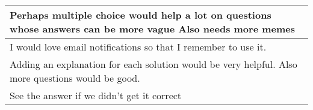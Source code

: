 \begin{longtable}{|p{1\linewidth}|}
		\hline
		Perhaps multiple choice would help a lot on questions whose answers can be more vague Also needs more memes                                                                                                                                                                                                                                                                                                                                                                                                                                                                                                                                                                                       \\
		\hline
		I would love email notifications so that I remember to use it.                                                                                                                                                                                                                                                                                                                                                                                                                                                                                                                                                                                                                                   \\
		\hline 
		Adding an explanation for each solution would be very helpful.  Also more questions would be good.                                                                                                                                                                                                                                                                                                                                                                                                                                                                                                                                                                                               \\
		\hline 
		See the answer if we didn't get it correct                                                                                                                                                                                                                                                                                                                                                                                                                                                                                                                                                                                                                                                       \\

\end{longtable}

